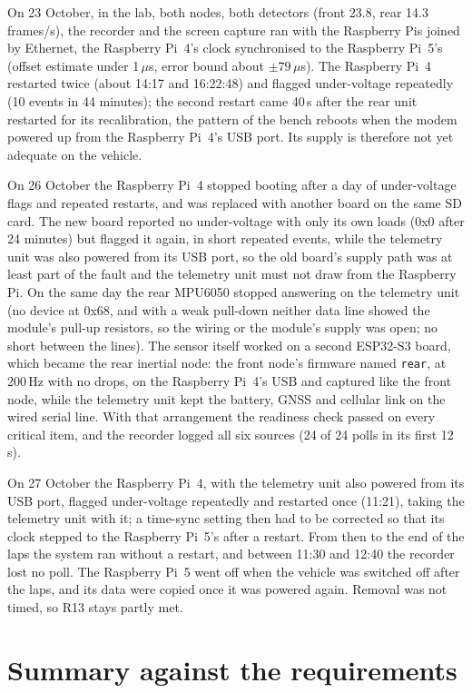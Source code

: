 On 23 October, in the lab, both nodes, both detectors (front 23.8, rear 14.3\,frames/s), the recorder and the screen capture ran with the Raspberry Pis joined by Ethernet, the Raspberry Pi~4's clock synchronised to the Raspberry Pi~5's (offset estimate under 1\,$\mu$s, error bound about $\pm 79\,\mu$s). The Raspberry Pi~4 restarted twice (about 14:17 and 16:22:48) and flagged under-voltage repeatedly (10 events in 44 minutes); the second restart came 40\,s after the rear unit restarted for its recalibration, the pattern of the bench reboots when the modem powered up from the Raspberry Pi~4's USB port. Its supply is therefore not yet adequate on the vehicle.

On 26 October the Raspberry Pi~4 stopped booting after a day of under-voltage flags and repeated restarts, and was replaced with another board on the same SD card. The new board reported no under-voltage with only its own loads (0x0 after 24 minutes) but flagged it again, in short repeated events, while the telemetry unit was also powered from its USB port, so the old board's supply path was at least part of the fault and the telemetry unit must not draw from the Raspberry Pi. On the same day the rear MPU6050 stopped answering on the telemetry unit (no device at 0x68, and with a weak pull-down neither data line showed the module's pull-up resistors, so the wiring or the module's supply was open; no short between the lines). The sensor itself worked on a second ESP32-S3 board, which became the rear inertial node: the front node's firmware named \texttt{rear}, at 200\,Hz with no drops, on the Raspberry Pi~4's USB and captured like the front node, while the telemetry unit kept the battery, GNSS and cellular link on the wired serial line. With that arrangement the readiness check passed on every critical item, and the recorder logged all six sources (24 of 24 polls in its first 12\,s).

On 27 October the Raspberry Pi~4, with the telemetry unit also powered from its USB port, flagged under-voltage repeatedly and restarted once (11:21), taking the telemetry unit with it; a time-sync setting then had to be corrected so that its clock stepped to the Raspberry Pi~5's after a restart. From then to the end of the laps the system ran without a restart, and between 11:30 and 12:40 the recorder lost no poll. The Raspberry Pi~5 went off when the vehicle was switched off after the laps, and its data were copied once it was powered again. Removal was not timed, so R13 stays partly met.

\section{Summary against the requirements}
\label{sec:res-summary}

